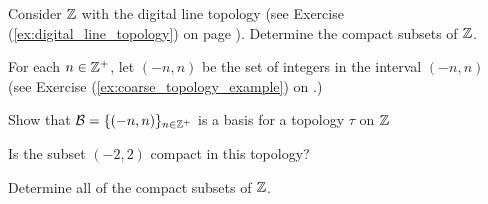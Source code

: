 \item Consider $\mathbb{Z}$ with the digital line topology (see Exercise (\ref{ex:digital_line_topology}) on page \pageref{ex:digital_line_topology}). Determine the compact subsets of $\mathbb{Z}$. 

\begin{comment}

\ExerciseSolution We will show that the only compact subsets of $\Z$ are the finite subsets. Since we know that finite sets are compact, we only need to verify that no infinite subset of $\Z$ is compact. Let $A$ be an infinite subset of $\Z$. Recall that a basis for the digital line topology on $\Z$ is the collection $\{B(n)\}$, where $B(n) = \{n\}$ if $n$ is odd and $B(n) = \{n-1,n,n+1\}$ if $n$ is even. So $\{B(n)\}_{n \in A}$ is an open cover of $A$. Since each $B(n)$ is finite, any finite subcollection of sets in $\{B(n)\}_{n \in A}$ will have a finite union and can't form a cover of $A$. We conclude that $A$ is not compact. 

\end{comment}

\item For each $n \in \mathbb{Z}^+$, let $(-n,n)$ be the set of integers in the interval $(-n,n)$ (see Exercise (\ref{ex:coarse_topology_example}) on \pageref{ex:coarse_topology_example}.)  
	\ba
	\item Show that $\mathcal{B} = \{(-n,n)\}_{n \in \mathbb{Z}^+}$ is a basis for a topology $\tau$ on $\mathbb{Z}$
	
	\item Is the subset $(-2,2)$ compact in this topology?
	
	\item Determine all of the compact subsets of $\mathbb{Z}$.
	
	\ea

